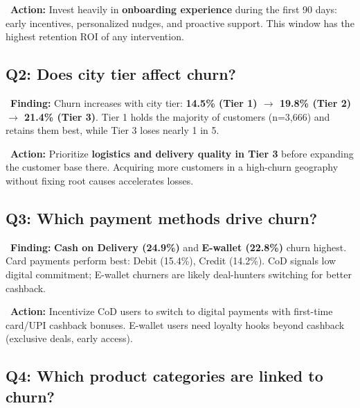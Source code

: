 \documentclass[11pt,a4paper]{article}
\begin{document}
\begin{actionbox}
\faArrowRight\ \textbf{Action:} Invest heavily in \textbf{onboarding experience} during the first 90 days: early incentives, personalized nudges, and proactive support. This window has the highest retention ROI of any intervention.
\end{actionbox}

\subsection{Q2: Does city tier affect churn?}

\begin{findingbox}
\faSearch\ \textbf{Finding:} Churn increases with city tier: \textbf{14.5\% (Tier 1) $\rightarrow$ 19.8\% (Tier 2) $\rightarrow$ 21.4\% (Tier 3)}. Tier 1 holds the majority of customers (n=3,666) and retains them best, while Tier 3 loses nearly 1 in 5.
\end{findingbox}

\begin{actionbox}
\faArrowRight\ \textbf{Action:} Prioritize \textbf{logistics and delivery quality in Tier 3} before expanding the customer base there. Acquiring more customers in a high-churn geography without fixing root causes accelerates losses.
\end{actionbox}

\subsection{Q3: Which payment methods drive churn?}

\begin{findingbox}
\faSearch\ \textbf{Finding:} \textbf{Cash on Delivery (24.9\%)} and \textbf{E-wallet (22.8\%)} churn highest. Card payments perform best: Debit (15.4\%), Credit (14.2\%). CoD signals low digital commitment; E-wallet churners are likely deal-hunters switching for better cashback.
\end{findingbox}

\begin{actionbox}
\faArrowRight\ \textbf{Action:} Incentivize CoD users to switch to digital payments with first-time card/UPI cashback bonuses. E-wallet users need loyalty hooks beyond cashback (exclusive deals, early access).
\end{actionbox}

\subsection{Q4: Which product categories are linked to churn?}
\end{document}

